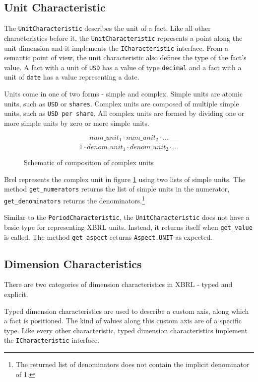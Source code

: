 \subsection{Unit Characteristic}

The \texttt{UnitCharacteristic} describes the unit of a fact.
Like all other characteristics before it, the \texttt{UnitCharacteristic} represents a point along the unit dimension 
and it implements the \texttt{ICharacteristic} interface.
From a semantic point of view, the unit characteristic also defines the type of the fact's value.
A fact with a unit of \texttt{USD} has a value of type \texttt{decimal} and a fact with a unit of \texttt{date} has a value representing a date.

Units come in one of two forms - simple and complex.
Simple units are atomic units, such as \texttt{USD} or \texttt{shares}.
Complex units are composed of multiple simple units, such as \texttt{USD per share}.
All complex units are formed by dividing one or more simple units by zero or more simple units.

\begin{figure}[H]
    \centering
    \caption{Schematic of composition of complex units}
    $$\frac{num\_unit_1 \cdot num\_unit_2 \cdot ...}{1 \cdot denom\_unit_1 \cdot denom\_unit_2 \cdot ...}$$
    \label{fig:complex_unit}
\end{figure}

Brel represents the complex unit in figure \ref{fig:complex_unit} using two lists of simple units.
The method \texttt{get\_numerators} returns the list of simple units in the numerator, \texttt{get\_denominators} returns the denominators.\footnote{The returned list of denominators does not contain the implicit denominator of 1.}

Similar to the \texttt{PeriodCharacteristic}, the \texttt{UnitCharacteristic} does not have a basic type for representing XBRL units.
Instead, it returns itself when \texttt{get\_value} is called.
The method \texttt{get\_aspect} returns \texttt{Aspect.UNIT} as expected.

\subsection{Dimension Characteristics}

There are two categories of dimension characteristics in XBRL - typed and explicit.

Typed dimension characteristics are used to describe a custom axis, along which a fact is positioned.
The kind of values along this custom axis are of a specific type.
Like every other characteristic, typed dimension characteristics implement the \texttt{ICharacteristic} interface.

